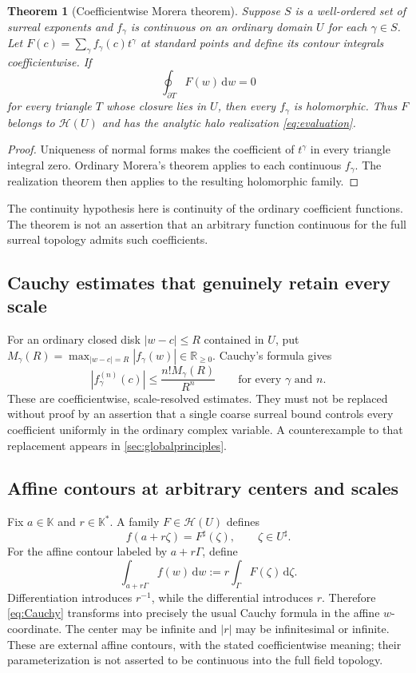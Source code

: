 \documentclass[11pt,letterpaper]{article}
\numberwithin{equation}{section}
\newtheorem{theorem}{Theorem}[section]
\theoremstyle{definition}
\theoremstyle{remark}
\newcommand{\K}{\mathbb K}
\newcommand{\R}{\mathbb R}
\newcommand{\HH}{\mathscr H}
\newcommand{\dd}{\,\mathrm d}
\begin{document}
\begin{theorem}[Coefficientwise Morera theorem]\label{thm:Morera}
Suppose $S$ is a well-ordered set of surreal exponents and $f_\gamma$
is continuous on an ordinary domain $U$ for each $\gamma\in S$.
Let $F(c)=\sum_\gamma f_\gamma(c)t^\gamma$ at standard points and
define its contour integrals coefficientwise. If
\[
 \oint_{\partial T}F(w)\dd w=0
\]
for every triangle $T$ whose closure lies in $U$, then every $f_\gamma$
is holomorphic. Thus $F$ belongs to $\HH(U)$ and has the analytic halo
realization \eqref{eq:evaluation}.
\end{theorem}
\begin{proof}
Uniqueness of normal forms makes the coefficient of $t^\gamma$ in every
triangle integral zero. Ordinary Morera's theorem applies to each
continuous $f_\gamma$. The realization theorem then applies to the
resulting holomorphic family.
\end{proof}

The continuity hypothesis here is continuity of the ordinary coefficient
functions. The theorem is not an assertion that an arbitrary function
continuous for the full surreal topology admits such coefficients.

\subsection{Cauchy estimates that genuinely retain every scale}

For an ordinary closed disk $|w-c|\le R$ contained in $U$, put
$M_\gamma(R)=\max_{|w-c|=R}|f_\gamma(w)|\in\R_{\ge0}$.
Cauchy's formula gives
\begin{equation}\label{eq:coeffCauchy}
 |f_\gamma^{(n)}(c)|\le \frac{n!M_\gamma(R)}{R^n}
 \qquad\text{for every }\gamma\text{ and }n.
\end{equation}
These are coefficientwise, scale-resolved estimates. They must not be
replaced without proof by an assertion that a single coarse surreal
bound controls every coefficient uniformly in the ordinary complex
variable. A counterexample to that replacement appears in
\cref{sec:globalprinciples}.

\subsection{Affine contours at arbitrary centers and scales}

Fix $a\in\K$ and $r\in\K^*$. A family $F\in\HH(U)$ defines
\[
 f(a+r\zeta)=F^\sharp(\zeta),\qquad\zeta\in U^\sharp.
\]
For the affine contour labeled by $a+r\Gamma$, define
\[
 \int_{a+r\Gamma}f(w)\dd w
 :=r\int_\Gamma F(\zeta)\dd\zeta.
\]
Differentiation introduces $r^{-1}$, while the differential introduces
$r$. Therefore \eqref{eq:Cauchy} transforms into precisely the usual
Cauchy formula in the affine $w$-coordinate. The center may be infinite and
$|r|$ may be infinitesimal or infinite. These are external affine
contours, with the stated coefficientwise meaning; their parameterization
is not asserted to be continuous into the full field topology.
\end{document}
